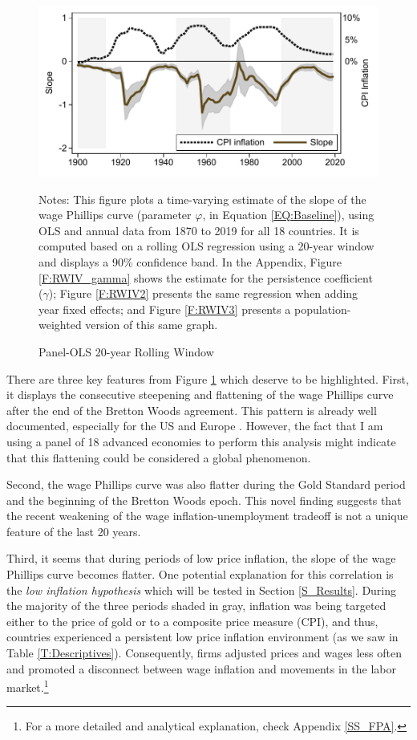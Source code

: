 \documentclass[12pt]{article}
\newcommand{\annote}[1]{\parbox{\textwidth}{\renewcommand{\baselinestretch}{1.0}\vspace{12pt} \footnotesize Notes: #1}}
\begin{document}
\begin{figure}[h]
    \centering
    \caption{Panel-OLS 20-year Rolling Window}
    \includegraphics[scale=1]{../Output/Figures/Figure_2}
    \annote{\footnotesize This figure plots a time-varying estimate of the slope of the wage Phillips curve (parameter $\varphi$, in Equation \eqref{EQ:Baseline}), using OLS and annual data from 1870 to 2019 for all 18 countries. It is computed based on a rolling OLS regression using a 20-year window and displays a 90\% confidence band. In the Appendix, Figure \ref{F:RWIV_gamma} shows the estimate for the persistence coefficient ($\gamma$); Figure \ref{F:RWIV2} presents the same regression when adding year fixed effects; and Figure \ref{F:RWIV3} presents a population-weighted version of this same graph.}
    \label{F:RWIV}
\end{figure}

There are three key features from Figure \ref{F:RWIV} which deserve to be highlighted. First, it displays the consecutive steepening and flattening of the wage Phillips curve after the end of the Bretton Woods agreement. This pattern is already well documented, especially for the US \citep{Ball2011, Blanchard2015, Blanchard2016, Gali2019} and Europe \citep{Bonam2021}. However, the fact that I am using a panel of 18 advanced economies to perform this analysis might indicate that this flattening could be considered a global phenomenon.

Second, the wage Phillips curve was also flatter during the Gold Standard period and the beginning of the Bretton Woods epoch. This novel finding suggests that the recent weakening of the wage inflation-unemployment tradeoff is not a unique feature of the last 20 years.

Third, it seems that during periods of low price inflation, the slope of the wage Phillips curve becomes flatter. One potential explanation for this correlation is the \textit{low inflation hypothesis} which will be tested in Section \ref{S_Results}. During the majority of the three periods shaded in gray, inflation was being targeted either to the price of gold or to a composite price measure (CPI), and thus, countries experienced a persistent low price inflation environment (as we saw in Table \ref{T:Descriptives}). Consequently, firms adjusted prices and wages less often \citep{Gagnon2009, Nakamura2018, Alvarez2019} and promoted a disconnect between wage inflation and movements in the labor market.\footnote{For a more detailed and analytical explanation, check Appendix \ref{SS_FPA}.}
\end{document}
